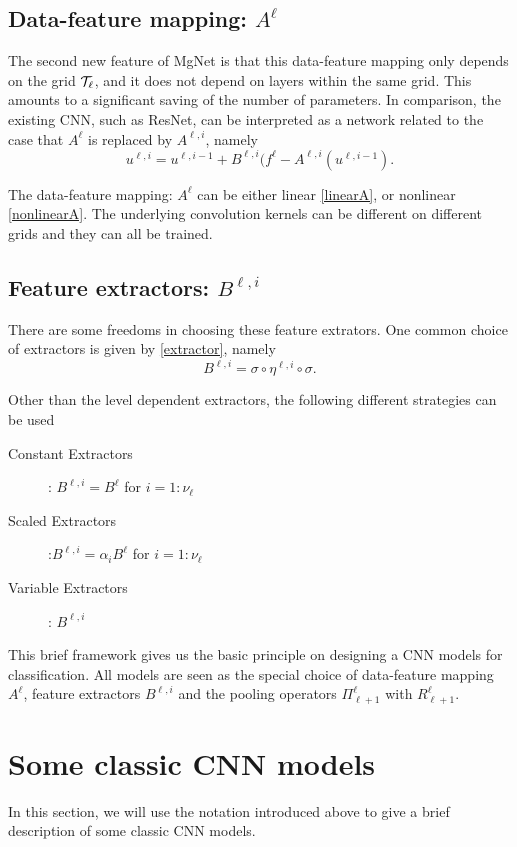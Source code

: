 \subsection{Data-feature mapping: $A^{\ell}$}
The second new feature of MgNet is that this data-feature mapping
only depends on the grid ${\cal T}_\ell$, and it does not depend on layers
within the same grid.  This amounts to a significant saving of the number of
parameters.  In comparison, the existing CNN, such as ResNet, can be
interpreted as a network related to the case that $A^{\ell}$ is
replaced by $A^{\ell, i}$, namely
\begin{equation}\label{u-resnet}
u^{\ell,i} = u^{\ell,i-1} + B^{\ell,i}  (f^\ell -  A^{\ell,i} (u^{\ell,i-1}).
\end{equation}

The data-feature mapping: $A^{\ell}$ can be either linear
\eqref{linearA}, or nonlinear \eqref{nonlinearA}.  The underlying
convolution kernels can be different on different grids and they can
all be trained.


\subsection{Feature extractors: $B^{\ell,i}$}
There are some freedoms in choosing these feature extrators.  
One common choice of extractors is given by \eqref{extractor}, namely 
\begin{equation}
\label{extractor-ell}
B^{\ell,i}=\sigma\circ \eta^{\ell,i}\circ\sigma.
\end{equation}

Other than the level dependent extractors, the following 
different strategies can be used
\begin{description}
	\item[Constant Extractors]: $B^{\ell,i}=B^{\ell}$ for   $i=1:\nu_\ell$
	\item[Scaled Extractors]:$B^{\ell,i}=\alpha_iB^{\ell}$ for   $i=1:\nu_\ell$
	\item[Variable Extractors]: $B^{\ell,i}$
\end{description}



This brief framework gives us the basic principle on designing 
a CNN models for classification. All models are seen as the special
choice of data-feature mapping $A^\ell$, feature extractors $B^{\ell,i}$ 
and the pooling operators $\Pi_{\ell+1}^\ell$ with $R_{\ell+1}^\ell$.


\section{Some classic CNN models}\label{sec:CNNs}
In this section, we will use the notation introduced above to 
give a brief description of some classic CNN models.

